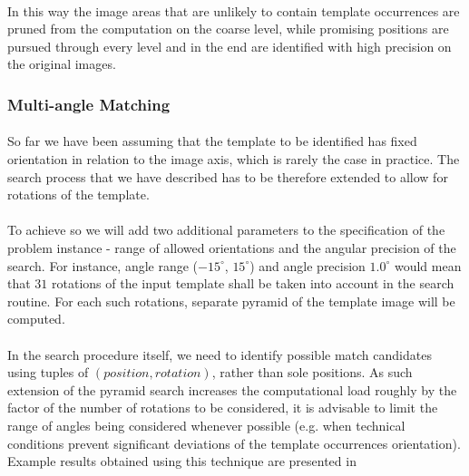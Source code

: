 \paragraph*{}
In this way the image areas that are unlikely to contain template occurrences are pruned from the computation on the coarse level, while promising positions are pursued through every level and in the end are identified with high precision on the original images.

\subsubsection{Multi-angle Matching}

\paragraph*{}
So far we have been assuming that the template to be identified has fixed orientation in relation to the image axis, which is rarely the case in practice. The search process that we have described has to be therefore extended to allow for rotations of the template.

\paragraph*{}
To achieve so we will add two additional parameters to the specification of the problem instance - range of allowed orientations and the angular precision of the search. For instance, angle range ($-15^{\circ}$, $15^{\circ}$) and angle precision $1.0^{\circ}$ would mean that $31$ rotations of the input template shall be taken into account in the search routine. For each such rotations, separate pyramid of the template image will be computed.

\paragraph*{}
In the search procedure itself, we need to identify possible match candidates using tuples of $(position, rotation)$, rather than sole positions. As such extension of the pyramid search increases the computational load roughly by the factor of the number of rotations to be considered, it is advisable to limit the range of angles being considered whenever possible (e.g. when technical conditions prevent significant deviations of the template occurrences orientation). Example results obtained using this technique are presented in 

